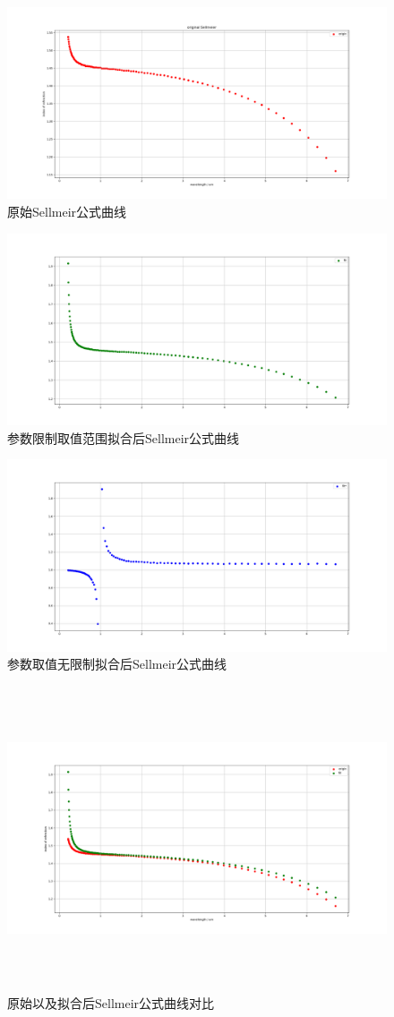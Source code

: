 \documentclass[12pt, a4paper, oneside]{ctexart}
\begin{document}
\begin{figure}[htbp]
    \centering
    \includegraphics[width=.81\textwidth]{origin.png}
    \caption{原始Sellmeir公式曲线}
\end{figure}
\begin{figure}[htbp]
    \centering
    \includegraphics[width=.81\textwidth]{fit.png}
    \caption{参数限制取值范围拟合后Sellmeir公式曲线}
\end{figure}
\begin{figure}[htbp]
    \centering
    \includegraphics[width=.81\textwidth]{fitnew.png}
    \caption{参数取值无限制拟合后Sellmeir公式曲线}
\end{figure}

\newpage
\begin{figure}[htbp]
    \centering
    \includegraphics[width=15cm,height=9cm]{OandF.png}
    \caption{原始以及拟合后Sellmeir公式曲线对比}
\end{figure}
\end{document}
